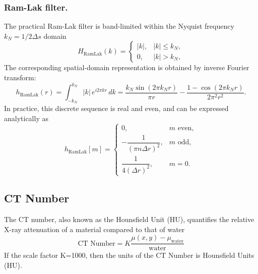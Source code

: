 \documentclass[../../../main.tex]{subfiles}
\begin{document}
\subsubsection{Ram-Lak filter.}
The practical Ram-Lak filter is band-limited within the Nyquist frequency $k_N=1/2\Delta s$ domain
\[
    H_{\text{RamLak}}(k) =
    \begin{cases}
        |k|, & |k| \le k_N, \\
        0,   & |k| > k_N,
    \end{cases}
\]
The corresponding spatial-domain representation is obtained by inverse Fourier transform:
\[
    h_{\text{RamLak}}(r) =
    \int_{-k_N}^{k_N} |k|\, e^{i2\pi k r}\, dk
    = \frac{k_N \sin(2\pi k_N r)}{\pi r}
    - \frac{1 - \cos(2\pi k_N r)}{2\pi^2 r^2}.
\]
In practice, this discrete sequence is real and even, and can be expressed analytically as
\[
    h_{\text{RamLak}}[m] =
    \begin{cases}
        0,                             & m \text{ even}, \\
        -\dfrac{1}{(\pi n\Delta r)^2}, & m \text{ odd},  \\
        \dfrac{1}{4(\Delta r)^2},      & m = 0.
    \end{cases}
\]

\subsection{CT Number}
The CT number, also known as the Hounsfield Unit (HU), quantifies the relative X-ray attenuation of a material compared to that of water
\begin{equation*}
    \text{CT Number}=K \frac{\mu(x,y)-\mu_\text{water}}{\text{water}}
\end{equation*}
If the scale factor K=1000, then the units of the CT Number is Hounsfield Units (HU).
\end{document}
